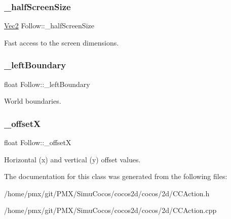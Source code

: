 \subsubsection{\texorpdfstring{\+\_\+half\+Screen\+Size}{\_halfScreenSize}}
{\footnotesize\ttfamily \hyperlink{classVec2}{Vec2} Follow\+::\+\_\+half\+Screen\+Size\hspace{0.3cm}{\ttfamily [protected]}}

Fast access to the screen dimensions. \mbox{\label{classFollow_a8f5c6d5f04b050b3462d7fe5f1f640a2}} 
\subsubsection{\texorpdfstring{\+\_\+left\+Boundary}{\_leftBoundary}}
{\footnotesize\ttfamily float Follow\+::\+\_\+left\+Boundary\hspace{0.3cm}{\ttfamily [protected]}}

World boundaries. \mbox{\label{classFollow_a52ca44d435542259d21f9e27bc24bb77}} 
\subsubsection{\texorpdfstring{\+\_\+offsetX}{\_offsetX}}
{\footnotesize\ttfamily float Follow\+::\+\_\+offsetX\hspace{0.3cm}{\ttfamily [protected]}}

Horizontal (x) and vertical (y) offset values. 

The documentation for this class was generated from the following files\+:\begin{DoxyCompactItemize}
\item 
/home/pmx/git/\+P\+M\+X/\+Simu\+Cocos/cocos2d/cocos/2d/C\+C\+Action.\+h\item 
/home/pmx/git/\+P\+M\+X/\+Simu\+Cocos/cocos2d/cocos/2d/C\+C\+Action.\+cpp\end{DoxyCompactItemize}
